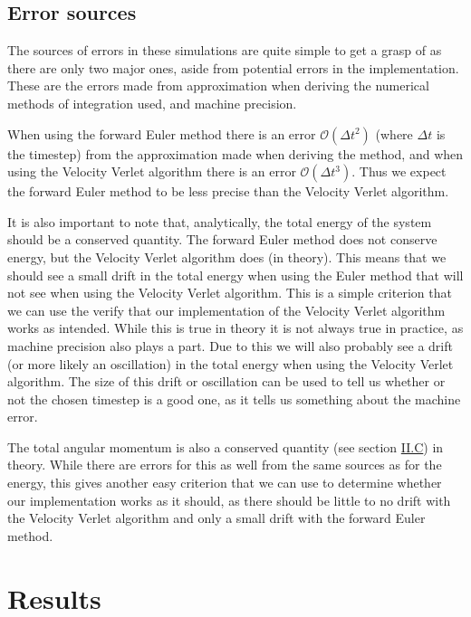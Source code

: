\documentclass[reprint,english,notitlepage]{revtex4-1}  %
\begin{document}
\subsection{Error sources} \label{sec:III:c}

The sources of errors in these simulations are quite simple to get a grasp of as there are only two major ones, aside from potential errors in the implementation. These are the errors made from approximation when deriving the numerical methods of integration used, and machine precision. 

When using the forward Euler method there is an error $\mathcal{O}(\Delta t^2)$ (where $\Delta t$ is the timestep) from the approximation made when deriving the method, and when using the Velocity Verlet algorithm there is an error $\mathcal{O}(\Delta t^3)$. Thus we expect the forward Euler method to be less precise than the Velocity Verlet algorithm. 

It is also important to note that, analytically, the total energy of the system should be a conserved quantity. The forward Euler method does not conserve energy, but the Velocity Verlet algorithm does (in theory). This means that we should see a small drift in the total energy when using the Euler method that will not see when using the Velocity Verlet algorithm. This is a simple criterion that we can use the verify that our implementation of the Velocity Verlet algorithm works as intended. While this is true in theory it is not always true in practice, as machine precision also plays a part. Due to this we will also probably see a drift (or more likely an oscillation) in the total energy when using the Velocity Verlet algorithm. The size of this drift or oscillation can be used to tell us whether or not the chosen timestep is a good one, as it tells us something about the machine error. 

The total angular momentum is also a conserved quantity (see section \hyperref[sec:II:c]{II.C}) in theory. While there are errors for this as well from the same sources as for the energy, this gives another easy criterion that we can use to determine whether our implementation works as it should, as there should be little to no drift with the Velocity Verlet algorithm and only a small drift with the forward Euler method.  

 

\section{Results} \label{sec:IV}
\end{document}

